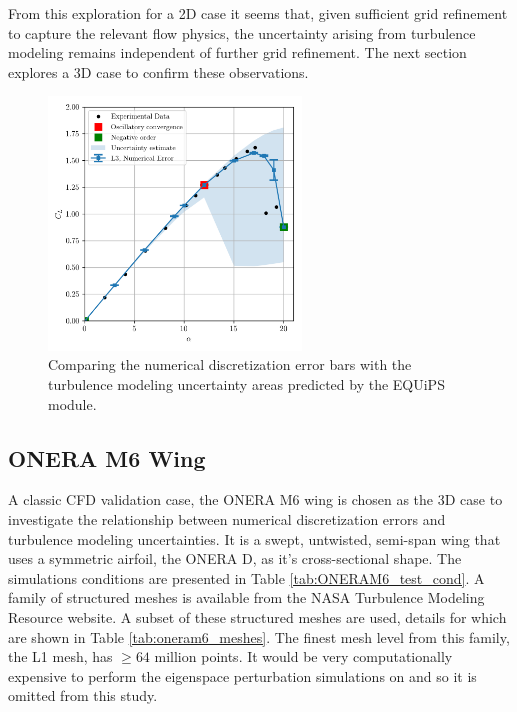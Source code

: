 From this exploration for a 2D case it seems that, given sufficient grid refinement to capture the relevant flow physics, the uncertainty arising from turbulence modeling remains independent of further grid refinement. 
The next section explores a 3D case to confirm these observations. 

\begin{figure}
\center
\includegraphics[width=0.6\textwidth]{code/image_gen/naca0012/images/naca0012_CL_vs_alpha_num_uq_L3.png}
\caption{Comparing the numerical discretization error bars with the turbulence modeling uncertainty areas predicted by the EQUiPS module. \label{fig:naca0012_num+turb_uq}}
\end{figure}

\subsection{ONERA M6 Wing}

A classic CFD validation case, the ONERA M6 wing is chosen as the 3D case to investigate the relationship between numerical discretization errors and turbulence modeling uncertainties. 
It is a swept, untwisted, semi-span wing that uses a symmetric airfoil, the ONERA D, as it's cross-sectional shape. 
The simulations conditions are presented in Table \ref{tab:ONERAM6_test_cond}.
A family of structured meshes is available from the NASA Turbulence Modeling Resource website.
A subset of these structured meshes are used, details for which are shown in Table \ref{tab:oneram6_meshes}.
The finest mesh level from this family, the L1 mesh, has $\ge 64$ million points. 
It would be very computationally expensive to perform the eigenspace perturbation simulations on and so it is omitted from this study.

